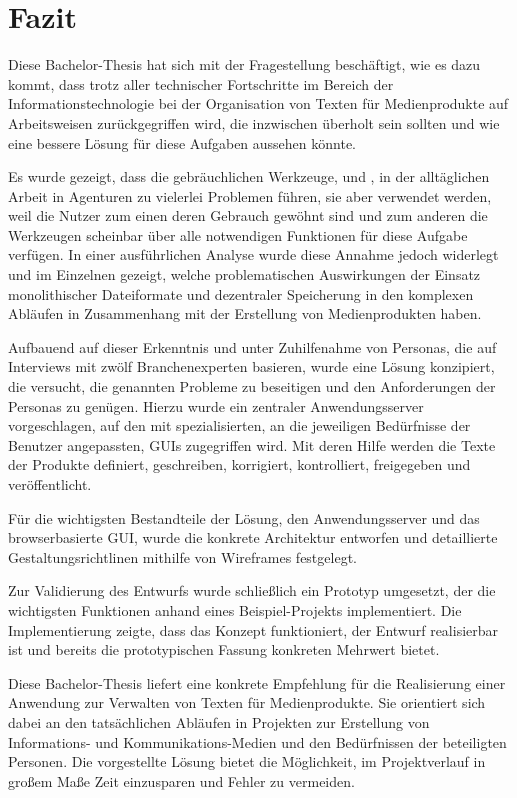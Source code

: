 \section{Fazit}\label{l:fazit}

Diese Bachelor-Thesis hat sich mit der Fragestellung beschäftigt, wie es dazu kommt, dass trotz aller technischer Fortschritte im Bereich der Informationstechnologie bei der Organisation von Texten für Medienprodukte auf Arbeitsweisen zurückgegriffen wird, die inzwischen überholt sein sollten und wie eine bessere Lösung für diese Aufgaben aussehen könnte.

Es wurde gezeigt, dass die gebräuchlichen Werkzeuge,  und , in der alltäglichen Arbeit in Agenturen zu vielerlei Problemen führen, sie aber verwendet werden, weil die Nutzer zum einen deren Gebrauch gewöhnt sind und zum anderen die Werkzeugen scheinbar über alle notwendigen Funktionen für diese Aufgabe verfügen. In einer ausführlichen Analyse wurde diese Annahme jedoch widerlegt und im Einzelnen gezeigt, welche problematischen Auswirkungen der Einsatz monolithischer Dateiformate und dezentraler Speicherung in den komplexen Abläufen in Zusammenhang mit der Erstellung von Medienprodukten haben.

Aufbauend auf dieser Erkenntnis und unter Zuhilfenahme von Personas, die auf Interviews mit zwölf Branchenexperten basieren, wurde eine Lösung konzipiert, die versucht, die genannten Probleme zu beseitigen und den Anforderungen der Personas zu genügen. Hierzu wurde ein zentraler Anwendungsserver vorgeschlagen, auf den mit spezialisierten, an die jeweiligen Bedürfnisse der Benutzer angepassten, GUIs zugegriffen wird. Mit deren Hilfe werden die Texte der Produkte definiert, geschreiben, korrigiert, kontrolliert, freigegeben und veröffentlicht.

Für die wichtigsten Bestandteile der Lösung, den Anwendungsserver und das browserbasierte GUI, wurde die konkrete Architektur entworfen und detaillierte Gestaltungsrichtlinen mithilfe von Wireframes festgelegt.

Zur Validierung des Entwurfs wurde schließlich ein Prototyp umgesetzt, der die wichtigsten Funktionen anhand eines Beispiel-Projekts implementiert. Die Implementierung zeigte, dass das Konzept funktioniert, der Entwurf realisierbar ist und bereits die prototypischen Fassung konkreten Mehrwert bietet.

\secbar

Diese Bachelor-Thesis liefert eine konkrete Empfehlung für die Realisierung einer Anwendung zur Verwalten von Texten für Medienprodukte. Sie orientiert sich dabei an den tatsächlichen Abläufen in Projekten zur Erstellung von Informations- und Kommunikations-Medien und den Bedürfnissen der beteiligten Personen. Die vorgestellte Lösung bietet die Möglichkeit, im Projektverlauf in großem Maße Zeit einzusparen und Fehler zu vermeiden.

\pagebreak